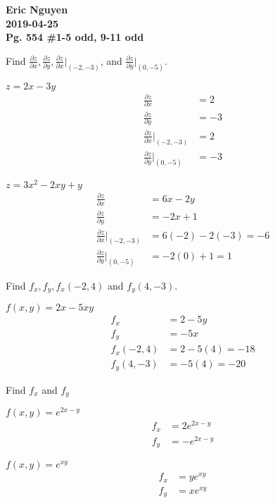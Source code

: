 \documentclass[12pt]{article}
\newenvironment{problem}[2][]{
    \begin{trivlist}
        \item[
            {\bfseries #1}
            {\bfseries #2.}
        ]
}{\end{trivlist}}
\newcommand{\assignment}{Pg. 554 \#1-5 odd, 9-11 odd}
\newcommand{\name}{Eric Nguyen}
\newcommand{\duedate}{2019-04-25}
\newcommand{\details}{\noindent\textbf{\name \\\duedate \\\assignment}}
\begin{document}
\details

\bigskip

\noindent Find $\frac{\partial z}{\partial x}, \frac{\partial z}{\partial y}, \frac{\partial z}{\partial x}\bigg|_{(-2, -3)}$, and $\frac{\partial z}{\partial y}\bigg|_{(0, -5)}$.

\begin{problem}{1}
    $z = 2x - 3y$
    \begin{align}
        \frac{\partial z}{\partial x} &= 2 \\
        \frac{\partial z}{\partial y} &= -3 \\
        \frac{\partial z}{\partial x} \bigg|_{(-2, -3)} &= 2 \\
        \frac{\partial z}{\partial y} \bigg|_{(0, -5)} &= -3
    \end{align}
\end{problem}

\begin{problem}{3}
    $z = 3x^2 - 2xy + y$
    \begin{align}
        \frac{\partial z}{\partial x} &= 6x - 2y \\
        \frac{\partial z}{\partial y} &= -2x + 1 \\
        \frac{\partial z}{\partial x} \bigg|_{(-2, -3)} &= 6(-2) - 2(-3) = -6 \\
        \frac{\partial z}{\partial y} \bigg|_{(0, -5)} &= -2(0) + 1 = 1
    \end{align}
\end{problem}

\bigskip

\noindent Find $f_x, f_y, f_x(-2, 4)$ and $f_y(4, -3)$.

\begin{problem}{5}
    $f(x,y) = 2x - 5xy$
    \begin{align}
        f_x &= 2 - 5y \\
        f_y &= -5x \\
        f_x(-2, 4) &= 2 - 5(4) = -18 \\
        f_y(4, -3) &= -5(4) = -20
    \end{align}
\end{problem}

\bigskip

\noindent Find $f_x$ and $f_y$

\begin{problem}{9}
    $f(x,y) = e^{2x - y}$
    \begin{align}
        f_x &= 2e^{2x - y} \\
        f_y &= -e^{2x - y}
    \end{align}
\end{problem}

\begin{problem}{11}
    $f(x,y) = e^{xy}$
    \begin{align}
        f_x &= ye^{xy} \\
        f_y &= xe^{xy}
    \end{align}
\end{problem}
\end{document}
